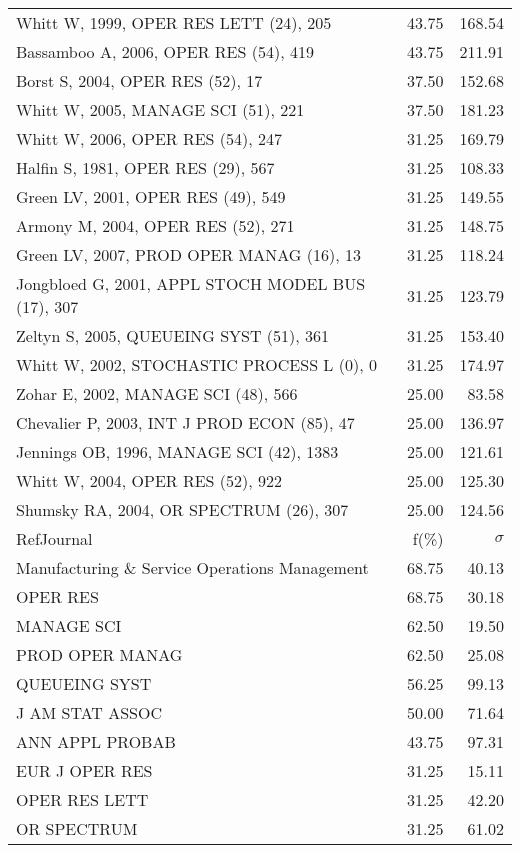 \documentclass[a4paper,11pt]{report}
\begin{document}
\begin{landscape}
\begin{table}[!ht]
{\begin{tabular}{|l r r|}
Whitt W, 1999, OPER RES LETT (24), 205 & 43.75 & 168.54\\
Bassamboo A, 2006, OPER RES (54), 419 & 43.75 & 211.91\\
Borst S, 2004, OPER RES (52), 17 & 37.50 & 152.68\\
Whitt W, 2005, MANAGE SCI (51), 221 & 37.50 & 181.23\\
Whitt W, 2006, OPER RES (54), 247 & 31.25 & 169.79\\
Halfin S, 1981, OPER RES (29), 567 & 31.25 & 108.33\\
Green LV, 2001, OPER RES (49), 549 & 31.25 & 149.55\\
Armony M, 2004, OPER RES (52), 271 & 31.25 & 148.75\\
Green LV, 2007, PROD OPER MANAG (16), 13 & 31.25 & 118.24\\
Jongbloed G, 2001, APPL STOCH MODEL BUS (17), 307 & 31.25 & 123.79\\
Zeltyn S, 2005, QUEUEING SYST (51), 361 & 31.25 & 153.40\\
Whitt W, 2002, STOCHASTIC PROCESS L (0), 0 & 31.25 & 174.97\\
Zohar E, 2002, MANAGE SCI (48), 566 & 25.00 & 83.58\\
Chevalier P, 2003, INT J PROD ECON (85), 47 & 25.00 & 136.97\\
Jennings OB, 1996, MANAGE SCI (42), 1383 & 25.00 & 121.61\\
Whitt W, 2004, OPER RES (52), 922 & 25.00 & 125.30\\
Shumsky RA, 2004, OR SPECTRUM (26), 307 & 25.00 & 124.56\\
\hline
\hline
RefJournal & f(\%) & $\sigma$\\
\hline
Manufacturing \& Service Operations Management & 68.75 & 40.13\\
OPER RES & 68.75 & 30.18\\
MANAGE SCI & 62.50 & 19.50\\
PROD OPER MANAG & 62.50 & 25.08\\
QUEUEING SYST & 56.25 & 99.13\\
J AM STAT ASSOC & 50.00 & 71.64\\
ANN APPL PROBAB & 43.75 & 97.31\\
EUR J OPER RES & 31.25 & 15.11\\
OPER RES LETT & 31.25 & 42.20\\
OR SPECTRUM & 31.25 & 61.02\\
\hline
\end{tabular}
}
\end{table}


\end{landscape}
\end{document}
